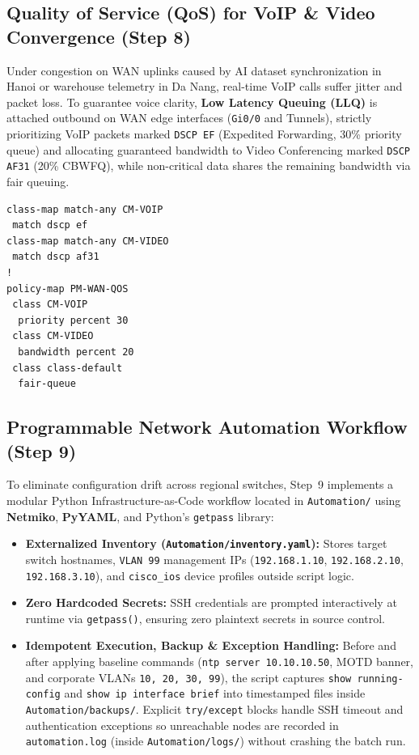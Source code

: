 \subsection{Quality of Service (QoS) for VoIP \& Video Convergence (Step 8)}
Under congestion on WAN uplinks caused by AI dataset synchronization in Hanoi or warehouse telemetry in Da Nang, real-time VoIP calls suffer jitter and packet loss. To guarantee voice clarity, \textbf{Low Latency Queuing (LLQ)} is attached outbound on WAN edge interfaces (\texttt{Gi0/0} and Tunnels), strictly prioritizing VoIP packets marked \texttt{DSCP EF} (Expedited Forwarding, 30\% priority queue) and allocating guaranteed bandwidth to Video Conferencing marked \texttt{DSCP AF31} (20\% CBWFQ), while non-critical data shares the remaining bandwidth via fair queuing.

\begin{lstlisting}[style=CiscoCLI, caption={Standardized LLQ QoS Policy-Map for WAN Interfaces.}]
class-map match-any CM-VOIP
 match dscp ef
class-map match-any CM-VIDEO
 match dscp af31
!
policy-map PM-WAN-QOS
 class CM-VOIP
  priority percent 30
 class CM-VIDEO
  bandwidth percent 20
 class class-default
  fair-queue
\end{lstlisting}

\subsection{Programmable Network Automation Workflow (Step 9)}
To eliminate configuration drift across regional switches, Step~9 implements a modular Python Infrastructure-as-Code workflow located in \texttt{Automation/} using \textbf{Netmiko}, \textbf{PyYAML}, and Python's \texttt{getpass} library:
\begin{itemize}[leftmargin=1.5em, itemsep=2pt]
    \item \textbf{Externalized Inventory (\texttt{Automation/inventory.yaml}):} Stores target switch hostnames, \texttt{VLAN 99} management IPs (\texttt{192.168.1.10}, \texttt{192.168.2.10}, \texttt{192.168.3.10}), and \texttt{cisco\_ios} device profiles outside script logic.
    \item \textbf{Zero Hardcoded Secrets:} SSH credentials are prompted interactively at runtime via \texttt{getpass()}, ensuring zero plaintext secrets in source control.
    \item \textbf{Idempotent Execution, Backup \& Exception Handling:} Before and after applying baseline commands (\texttt{ntp server 10.10.10.50}, MOTD banner, and corporate VLANs \texttt{10, 20, 30, 99}), the script captures \texttt{show running-config} and \texttt{show ip interface brief} into timestamped files inside \texttt{Automation/backups/}. Explicit \texttt{try/except} blocks handle SSH timeout and authentication exceptions so unreachable nodes are recorded in \texttt{automation.log} (inside \texttt{Automation/logs/}) without crashing the batch run.
\end{itemize}

